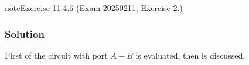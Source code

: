 \documentclass[letterpaper,10pt,english]{jupyterBook}
\begin{document}
\begin{sphinxadmonition}{note}{Exercise 11.4.6 (Exam 2025\sphinxhyphen{}02\sphinxhyphen{}11, Exercise 2.)}



\begin{figure}[htbp]
\centering

\noindent{}
\end{figure}
\subsubsection*{Solution}

\sphinxAtStartPar
First {\hyperref[\detokenize{ch/electrical-engineering-networks-linear:classical-electromagnetism-electrical-engineering-newtork-analysis-thevenin-1-port}]{}} of the circuit with port \(A-B\) is evaluated, then {\hyperref[\detokenize{ch/electrical-engineering-networks-harmonic:classical-electromagnetism-electrical-engineering-newtork-analysis-harmonic-power}]{}} is discussed.


\end{sphinxadmonition}
\end{document}
